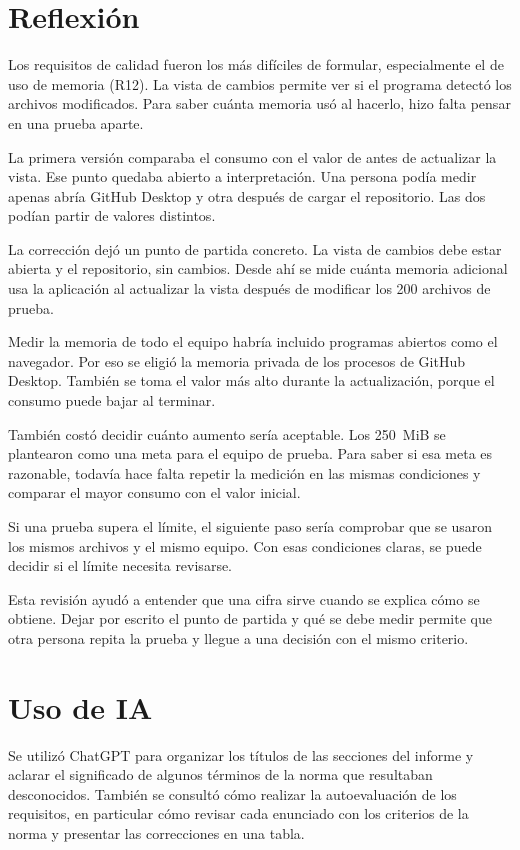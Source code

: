 \documentclass[11pt,a4paper]{article}
\begin{document}
\section{Reflexión}

Los requisitos de calidad fueron los más difíciles de formular,
especialmente el de uso de memoria (R12). La vista de cambios permite ver
si el programa detectó los archivos modificados. Para saber cuánta
memoria usó al hacerlo, hizo falta pensar en una prueba aparte.

La primera versión comparaba el consumo con el valor de antes de
actualizar la vista. Ese punto quedaba abierto a interpretación. Una
persona podía medir apenas abría GitHub Desktop y otra después de cargar
el repositorio. Las dos podían partir de valores distintos.

La corrección dejó un punto de partida concreto. La vista de cambios
debe estar abierta y el repositorio, sin cambios. Desde ahí se mide
cuánta memoria adicional usa la aplicación al actualizar la vista
después de modificar los 200 archivos de prueba.

Medir la memoria de todo el equipo habría incluido programas abiertos
como el navegador. Por eso se eligió la memoria privada de los procesos
de GitHub Desktop. También se toma el valor más alto durante la
actualización, porque el consumo puede bajar al terminar.

También costó decidir cuánto aumento sería aceptable. Los 250~MiB se
plantearon como una meta para el equipo de prueba. Para saber si esa
meta es razonable, todavía hace falta repetir la medición en las mismas
condiciones y comparar el mayor consumo con el valor inicial.

Si una prueba supera el límite, el siguiente paso sería comprobar que
se usaron los mismos archivos y el mismo equipo. Con esas condiciones
claras, se puede decidir si el límite necesita revisarse.

Esta revisión ayudó a entender que una cifra sirve cuando se explica
cómo se obtiene. Dejar por escrito el punto de partida y qué se debe
medir permite que otra persona repita la prueba y llegue a una decisión
con el mismo criterio.

\section{Uso de IA}

Se utilizó ChatGPT para organizar los títulos de las secciones del informe
y aclarar el significado de algunos términos de la norma que resultaban
desconocidos. También se consultó cómo realizar la autoevaluación de los
requisitos, en particular cómo revisar cada enunciado con los criterios
de la norma y presentar las correcciones en una tabla.

\renewcommand{\refname}{Referencias}


\end{document}
